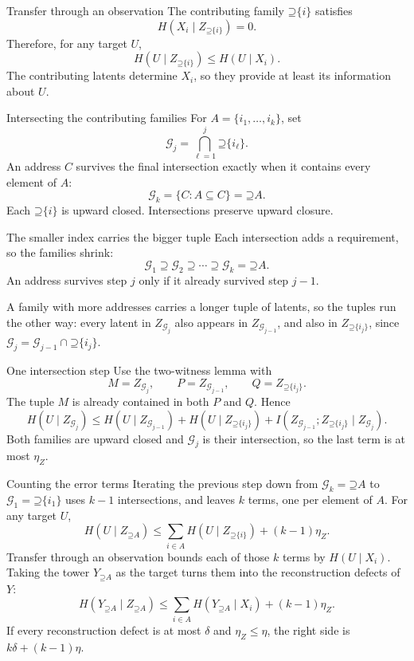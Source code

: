 \documentclass[aspectratio=169,12pt]{beamer}
\newcommand{\Up}{\mathord{\supseteq}}
\begin{document}
\begin{frame}{Transfer through an observation}
The contributing family $\Up\{i\}$ satisfies
\[
H(X_i\mid Z_{\Up\{i\}})=0.
\]
Therefore, for any target $U$,
\[
H(U\mid Z_{\Up\{i\}})\le H(U\mid X_i).
\]
The contributing latents determine $X_i$, so they provide at least its
information about $U$.
\end{frame}

\begin{frame}{Intersecting the contributing families}
For $A=\{i_1,\ldots,i_k\}$, set
\[
\mathcal G_j=\bigcap_{\ell=1}^{j}\Up\{i_\ell\}.
\]
An address $C$ survives the final intersection exactly when it contains every
element of $A$:
\[
\mathcal G_k=\{C:A\subseteq C\}=\Up A.
\]
Each $\Up\{i\}$ is upward closed. Intersections preserve upward closure.
\end{frame}

\begin{frame}{The smaller index carries the bigger tuple}
Each intersection adds a requirement, so the families shrink:
\[
\mathcal G_1\supseteq\mathcal G_2\supseteq\cdots\supseteq\mathcal G_k=\Up A.
\]
An address survives step $j$ only if it already survived step $j-1$.
\medskip

A family with more addresses carries a longer tuple of latents, so the tuples
run the other way: every latent in $Z_{\mathcal G_j}$ also appears in
$Z_{\mathcal G_{j-1}}$, and also in $Z_{\Up\{i_j\}}$, since
$\mathcal G_j=\mathcal G_{j-1}\cap\Up\{i_j\}$.
\end{frame}

\begin{frame}{One intersection step}
Use the two-witness lemma with
\[
M=Z_{\mathcal G_j},\qquad
P=Z_{\mathcal G_{j-1}},\qquad
Q=Z_{\Up\{i_j\}}.
\]
The tuple $M$ is already contained in both $P$ and $Q$. Hence
\[
H(U\mid Z_{\mathcal G_j})\le H(U\mid Z_{\mathcal G_{j-1}})
+H(U\mid Z_{\Up\{i_j\}})
+I(Z_{\mathcal G_{j-1}};Z_{\Up\{i_j\}}\mid Z_{\mathcal G_j}).
\]
Both families are upward closed and $\mathcal G_j$ is their intersection, so the
last term is at most $\eta_Z$.
\end{frame}

\begin{frame}{Counting the error terms}
Iterating the previous step down from $\mathcal G_k=\Up A$ to
$\mathcal G_1=\Up\{i_1\}$ uses $k-1$ intersections, and leaves $k$ terms,
one per element of $A$. For any target $U$,
\[
H(U\mid Z_{\Up A})\le\sum_{i\in A}H(U\mid Z_{\Up\{i\}})+(k-1)\eta_Z.
\]
Transfer through an observation bounds each of those $k$ terms by
$H(U\mid X_i)$. Taking the tower $Y_{\Up A}$ as the target turns them into
the reconstruction defects of $Y$:
\[
H(Y_{\Up A}\mid Z_{\Up A})
\le\sum_{i\in A}H(Y_{\Up A}\mid X_i)+(k-1)\eta_Z.
\]
If every reconstruction defect is at most $\delta$ and $\eta_Z\le\eta$, the
right side is $k\delta+(k-1)\eta$.
\end{frame}
\end{document}
